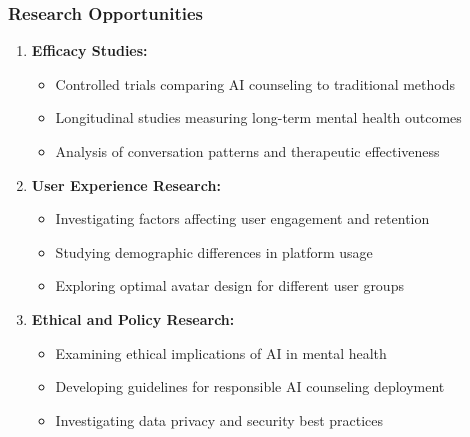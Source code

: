 \documentclass[11pt,a4paper]{article}
\begin{document}
\subsubsection{Research Opportunities}
\begin{enumerate}
    \item \textbf{Efficacy Studies:}
    \begin{itemize}
        \item Controlled trials comparing AI counseling to traditional methods
        \item Longitudinal studies measuring long-term mental health outcomes
        \item Analysis of conversation patterns and therapeutic effectiveness
    \end{itemize}
    
    \item \textbf{User Experience Research:}
    \begin{itemize}
        \item Investigating factors affecting user engagement and retention
        \item Studying demographic differences in platform usage
        \item Exploring optimal avatar design for different user groups
    \end{itemize}
    
    \item \textbf{Ethical and Policy Research:}
    \begin{itemize}
        \item Examining ethical implications of AI in mental health
        \item Developing guidelines for responsible AI counseling deployment
        \item Investigating data privacy and security best practices
    \end{itemize}
\end{enumerate}
\end{document}
